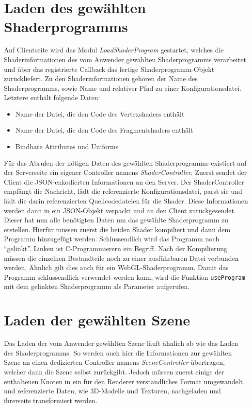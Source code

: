 \section{Laden des gewählten Shaderprogramms}
Auf Clientseite wird das Modul \textit{LoadShaderProgram} gestartet, welches die Shaderinformationen des vom Anwender gewählten Shaderprogramms verarbeitet und über das registrierte Callback das fertige Shaderprogramm-Objekt zurückliefert. Zu den Shaderinformationen gehören der Name des Shaderprogramms, sowie Name und relativer Pfad zu einer Konfigurationsdatei. Letztere enthält folgende Daten:
\begin{itemize}
    \item Name der Datei, die den Code des Vertexshaders enthält
    \item Name der Datei, die den Code des Fragmentshaders enthält
    \item Bindbare Attributes und Uniforms
\end{itemize}
Für das Abrufen der nötigen Daten des gewählten Shaderprogramms existiert auf der Serverseite ein eigener Controller namens \textit{ShaderController}. Zuerst sendet der Client die JSON-enkodierten Informationen an den Server. Der ShaderController empfängt die Nachricht, lädt die referenzierte Konfigurationsdatei, parst sie und lädt die darin referenzierten Quellcodedateien für die Shader. Diese Informationen werden dann in ein JSON-Objekt verpackt und an den Client zurückgesendet. Dieser hat nun alle benötigten Daten um das gewählte Shaderprogramm zu erstellen. Hierfür müssen zuerst die beiden Shader kompiliert und dann dem Programm hinzugefügt werden. Schlussendlich wird das Programm noch "`gelinkt"'. Linken ist C-Programmierern ein Begriff. Nach der Kompilierung müssen die einzelnen Bestandteile noch zu einer ausführbaren Datei verbunden werden. Ähnlich gilt dies auch für ein WebGL-Shaderprogramm. Damit das Programm schlussendlich verwendet werden kann, wird die Funktion \texttt{useProgram} mit dem gelinkten Shaderprogramm als Parameter aufgerufen.

\section{Laden der gewählten Szene}
Das Laden der vom Anwender gewählten Szene läuft ähnlich ab wie das Laden des Shaderprogramms. So werden auch hier die Informationen zur gewählten Szene an einen dedizierten Controller namens \textit{SceneController} übertragen, welcher dann die Szene selbst zurückgibt. Jedoch müssen zuerst einige der enthaltenen Knoten in ein für den Renderer verständliches Format umgewandelt und referenzierte Daten, wie 3D-Modelle und Texturen, nachgeladen und ihrerseits transformiert werden.


